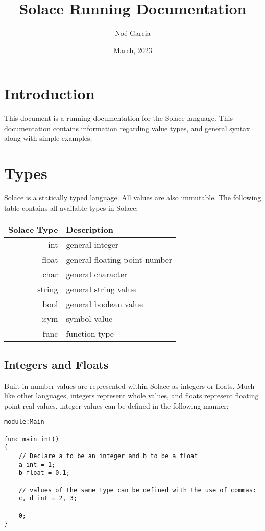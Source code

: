 \documentclass{article}
\title{
	\vspace{2in}
	\textmd{\textbf{Solace Running Documentation}}
	\vspace{3in}
}
\author{No\'e Garcia}
\date{March, 2023}
\begin{document}
\maketitle
\newpage

\section{Introduction}

This document is a running documentation for the Solace language. This documentation
contains information regarding value types, and general syntax along with simple examples.

\section{Types}

Solace is a statically typed language. All values are also immutable. The following table
contains all available types in Solace:

\begin{center}
\begin{tabular}{|r|l|}
	\hline
	Solace Type & Description \\
	\hline
	\hline
	int & general integer \\
	float & general floating point number \\
	char & general character \\
	string & general string value \\
	bool & general boolean value \\
	:sym & symbol value \\
	func & function type \\
	\hline
\end{tabular}
\end{center}

\subsection{Integers and Floats}

Built in number values are represented within Solace as integers or floats. Much like other
languages, integers represent whole values, and floats represent floating point real values.
integer values can be defined in the following manner:

\begin{lstlisting}
module:Main

func main int()
{
	// Declare a to be an integer and b to be a float
	a int = 1;
	b float = 0.1;
	
	// values of the same type can be defined with the use of commas:
	c, d int = 2, 3;
	
	0;
}
\end{lstlisting}
\end{document}
